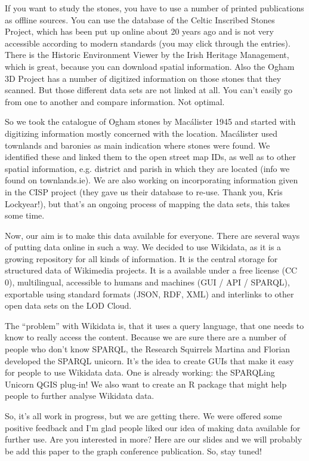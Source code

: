 \documentclass[twocolumn]{autart}
\begin{document}
If you want to study the stones, you have to use a number of printed publications as offline sources. You can use the database of the Celtic Inscribed Stones Project, which has been put up online about 20 years ago and is not very accessible according to modern standards (you may click through the entries). There is the Historic Environment Viewer by the Irish Heritage Management, which is great, because you can download spatial information. Also the Ogham 3D Project has a number of digitized information on those stones that they scanned. But those different data sets are not linked at all. You can’t easily go from one to another and compare information. Not optimal.

So we took the catalogue of Ogham stones by Macálister 1945 and started with digitizing information mostly concerned with the location. Macálister used townlands and baronies as main indication where stones were found. We identified these and linked them to the open street map IDs, as well as to other spatial information, e.g. district and parish in which they are located (info we found on townlands.ie). We are also working on incorporating information given in the CISP project (they gave us their database to re-use. Thank you, Kris Lockyear!), but that’s an ongoing process of mapping the data sets, this takes some time.

Now, our aim is to make this data available for everyone. There are several ways of putting data online in such a way. We decided to use Wikidata, as it is a growing repository for all kinds of information. It is the central storage for structured data of Wikimedia projects. It is a available under a free license (CC 0), multilingual, accessible to humans and machines (GUI / API / SPARQL), exportable using standard formats (JSON, RDF, XML) and interlinks to other open data sets on the LOD Cloud.

The “problem” with Wikidata is, that it uses a query language, that one needs to know to really access the content. Because we are sure there are a number of people who don’t know SPARQL, the Research Squirrels Martina and Florian developed the SPARQL unicorn. It’s the idea to create GUIs that make it easy for people to use Wikidata data. One is already working: the SPARQLing Unicorn QGIS plug-in! We also want to create an R package that might help people to further analyse Wikidata data.

So, it’s all work in progress, but we are getting there. We were offered some positive feedback and I’m glad people liked our idea of making data available for further use. Are you interested in more? Here are our slides and we will probably be add this paper to the graph conference publication. So, stay tuned!
\end{document}
